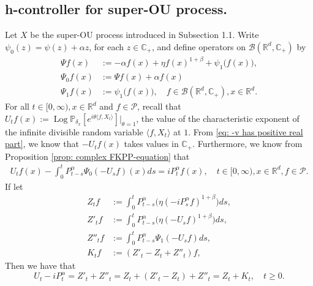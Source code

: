 \documentclass[12pt,a4paper]{amsart}
\theoremstyle{plain}
\theoremstyle{definition}
\numberwithin{equation}{section}
\begin{document}
\subsection{h-controller  for super-OU process.}
Let $X$ be the super-OU process introduced in Subsection 1.1. Write $\psi_0(z)=\psi(z)+\alpha z$, for each $z\in \mathbb{C}_+$, and define operators on $\mathcal{B}(\mathbb{R}^d,\mathbb{C}_+)$ by
\begin{equation}\begin{split}
    \Psi f (x) &:= -\alpha f(x) + \eta f(x)^{1+\beta} + \psi_1\big(f(x)\big),
    \\\Psi_0 f(x) &:= \Psi f(x) + \alpha f(x)
    \\ \Psi_1 f(x) &:= \psi_1 \big(f(x)\big),
    \quad  f\in \mathcal B(\mathbb R^d, \mathbb C_+), x\in \mathbb R^d.
\end{split}\end{equation}
For all $t\in [0,\infty), x\in \mathbb R^d $ and $f \in \mathcal{P}$, recall that $U_tf(x) := \operatorname{Log} \mathbb P_{\delta_x}[e^{i\theta \langle f, X_t\rangle}]|_{\theta = 1}$,
the value of the characteristic exponent of the infinite divisible random variable
$\langle f, X_t\rangle$ at $1$.
    From \eqref{eq: -v has positive real part}, we know that $-U_tf(x)$ takes values in $\mathbb C_+$. Furthermore, we know from Proposition \ref{prop: complex FKPP-equation} that
\begin{equation}\begin{split}
\label{eq:chareq2}
    U_tf(x)-\int_0^t P^\alpha_{t-s} \Psi_0(-U_sf)(x)ds
    =i P^{\alpha}_t f(x),
    \quad t\in [0,\infty), x\in \mathbb{R}^d, f\in \mathcal P.
\end{split}\end{equation}
If let
\begin{equation}\begin{split}
\label{eq: def of Zf}
    Z_t f
    &:= \int_0^t P^\alpha_{t-s}\big( \eta (-i P^\alpha_sf)^{1+\beta}\big)ds,
    \\ Z'_t f
    &:= \int_0^t P^\alpha_{t-s}\big( \eta (-U_s f)^{1+\beta}\big)ds,
    \\ Z''_t f
    &:= \int_0^t P^\alpha_{t-s}\Psi_1(-U_s f)ds,
    \\ K_t f
    &:= (Z'_t - Z_t+ Z''_t)f,
\end{split}\end{equation}
    Then we have that
\[
    U_t - i P^\alpha_t
    = Z'_t + Z''_t
    = Z_t+ (Z'_t - Z_t) + Z''_t
    = Z_t+K_t, \quad t\geq 0.
\]
\end{document}
